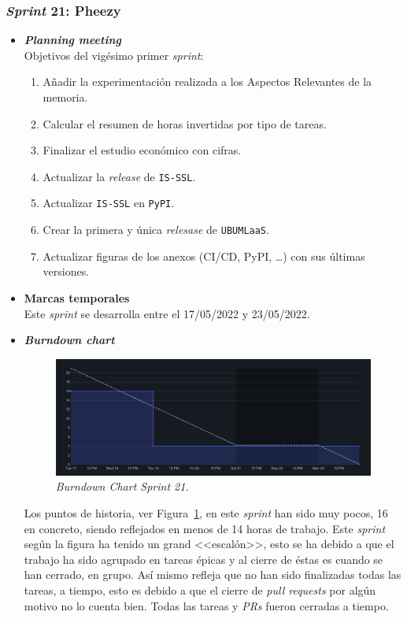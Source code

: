 \subsubsection{\textit{Sprint} 21: Pheezy}
\begin{itemize}
\item \textbf{\textit{Planning meeting}}\\
Objetivos del vigésimo primer \textit{sprint}:
\begin{enumerate}
\item Añadir la experimentación realizada a los Aspectos Relevantes de la memoria.
\item Calcular el resumen de horas invertidas por tipo de tareas.
\item Finalizar el estudio económico con cifras.
\item Actualizar la \textit{release} de \texttt{IS-SSL}.
\item Actualizar \texttt{IS-SSL} en \texttt{PyPI}.
\item Crear la primera y única \textit{relesase} de \texttt{UBUMLaaS}.
\item Actualizar figuras de los anexos (CI/CD, PyPI, \ldots) con sus últimas versiones.
\end{enumerate}

\item \textbf{Marcas temporales}\\
Este \textit{sprint} se desarrolla entre el 17/05/2022 y 23/05/2022.

\item \textbf{\textit{Burndown chart}}\\
\begin{figure}
\begin{center}
\includegraphics[width=\textwidth]{../img/anexos/sprints/BD-Sprint21}
\caption{\textit{Burndown Chart Sprint 21.}}\label{fig:BD-Sprint21}
\end{center}
\end{figure}
Los puntos de historia, ver Figura~\ref{fig:BD-Sprint21}, en este \textit{sprint} han sido muy pocos, 16 en concreto, siendo reflejados en menos de 14 horas de trabajo. Este \textit{sprint} según la figura ha tenido un grand <<escalón>>, esto se ha debido a que el trabajo ha sido agrupado en tareas épicas y al cierre de éstas es cuando se han cerrado, en grupo. Así mismo refleja que no han sido finalizadas todas las tareas, a tiempo, esto es debido a que el cierre de \textit{pull requests} por algún motivo no lo cuenta bien. Todas las tareas y \textit{PRs} fueron cerradas a tiempo.


\end{itemize}
